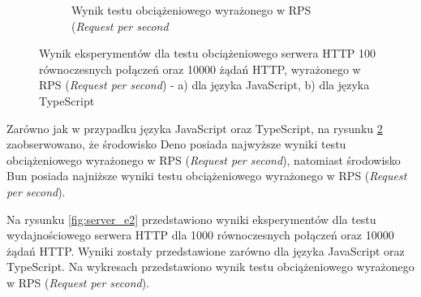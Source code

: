 \begin{figure}[H]
\begin{subfigure}[b]{0.42\textwidth}
    \caption{Wynik testu obciążeniowego wyrażonego w RPS (\textit{Request per second}}
    \label{fig:server_e1_ts}
  \end{subfigure}
  \caption{Wynik eksperymentów dla testu obciążeniowego serwera HTTP 100 równoczesnych połączeń oraz 10000 żądań HTTP, wyrażonego w RPS (\textit{Request per second}) - a) dla języka JavaScript, b) dla języka TypeScript}
  \label{fig:server_e1}
\end{figure}

Zarówno jak w przypadku języka JavaScript oraz TypeScript, na rysunku \ref{fig:server_e1} zaobserwowano, że środowisko Deno posiada najwyższe wyniki testu obciążeniowego wyrażonego w RPS (\textit{Request per second}), natomiast środowisko Bun posiada najniższe wyniki testu obciążeniowego wyrażonego w RPS (\textit{Request per second}).

Na rysunku \ref{fig:server_e2} przedstawiono wyniki eksperymentów dla testu wydajnościowego serwera HTTP dla 1000 równoczesnych połączeń oraz 10000 żądań HTTP. Wyniki zostały przedstawione zarówno dla języka JavaScript oraz TypeScript. Na wykresach przedstawiono wynik testu obciążeniowego wyrażonego w RPS (\textit{Request per second}).

